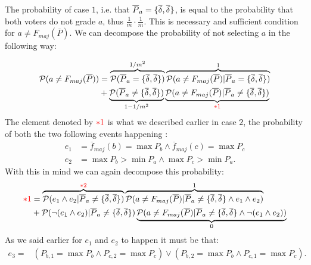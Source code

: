 \documentclass[version=3.21, pagesize, twoside=off, bibliography=totoc, DIV=calc, fontsize=12pt, a4paper]{scrartcl}
\begin{document}
The probability of case $1$, i.e. that $\overline{P}_a=\{\overline{\delta},\overline{\delta}\}$, is equal to the probability that both voters do not grade $a$, thus $\frac{1}{m}\cdot\frac{1}{m}$. This is necessary and sufficient condition for $a\neq F_{maj}(\overline{P})$. 
We can decompose the probability of not selecting $a$ in the following way:

\begin{align}
	\mathcal{P}(a\neq F_{maj}(\overline{P})) &=\overbrace{\mathcal{P}(\overline{P}_a=\{\overline{\delta},\overline{\delta}\})}^{1/m^2} \overbrace{\mathcal{P}(a\neq F_{maj}(\overline{P})|\overline{P}_a=\{\overline{\delta},\overline{\delta}\})}^{1}\\
	&+\underbrace{\mathcal{P}(\overline{P}_a\neq\{\overline{\delta},\overline{\delta}\})}_{1-1/m^2} \underbrace{\mathcal{P}(a\neq F_{maj}(\overline{P})|\overline{P}_a\neq\{\overline{\delta},\overline{\delta}\})}_{\color{red}*1}
\end{align}
The element denoted by ${\color{red}*1}$ is what we described earlier in case $2$, the probability of both the two following events happening :
\begin{align}
	e_1 &= \overline{f}_{maj}(b)=\max{P_{b}} \wedge \overline{f}_{maj}(c)=\max{P_{c}}\\
	e_2 &= \max{P_{b}}>\min{P_{a}} \wedge \max{P_{c}}>\min{P_{a}}.
\end{align}	
With this in mind we can again decompose this probability:
\begin{align}
	{\color{red}*1} &=\overbrace{\mathcal{P}(e_1 \wedge e_2 |\overline{P}_a\neq\{\overline{\delta},\overline{\delta}\}) }^{{\color{red}*2}} \overbrace{\mathcal{P}(a\neq F_{maj}(\overline{P})|\overline{P}_a\neq\{\overline{\delta},\overline{\delta}\}\wedge e_1 \wedge e_2)}^{1}\\
	&+\mathcal{P}(\lnot(e_1 \wedge e_2) |\overline{P}_a\neq\{\overline{\delta},\overline{\delta}\}) \underbrace{\mathcal{P}(a\neq F_{maj}(\overline{P})|\overline{P}_a\neq\{\overline{\delta},\overline{\delta}\}\wedge \lnot (e_1 \wedge e_2))}_{0}
\end{align}
As we said earlier for $e_1$ and $e_2$ to happen  it must be that:
\begin{align}
	e_3 = &(P_{b,1} = \max{P_{b}} \wedge P_{c,2} = \max{P_{c}}) \vee (P_{b,2} = \max{P_{b}} \wedge P_{c,1} = \max{P_{c}}) .
\end{align}
\end{document}
